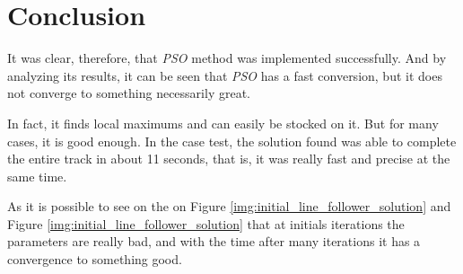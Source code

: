 



\section {Conclusion}

It was clear, therefore, that \textit{PSO} method was implemented successfully. And by analyzing its results, it can be seen that \textit{PSO} has a fast conversion, but it does not converge to something necessarily great.

In fact, it finds local maximums and can easily be stocked on it. But for many cases, it is good enough. In the case test, the solution found was able to complete the entire track in about 11 seconds, that is, it was really fast and precise at the same time.

As it is possible to see on the on Figure \ref{img:initial_line_follower_solution} and Figure \ref{img:initial_line_follower_solution} that at initials iterations the parameters are really bad, and with the time after many iterations it has a convergence to something good.

\vfill

